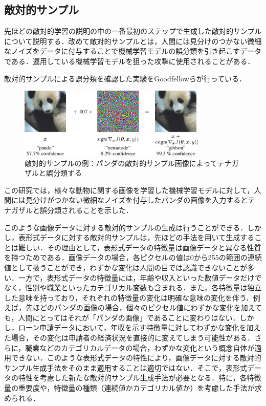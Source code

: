 \subsection{敵対的サンプル}
先ほどの敵対的学習の説明の中の一番最初のステップで生成した敵対的サンプルについて説明する．改めて敵対的サンプルとは，人間には見分けのつかない微細なノイズをデータに付与することで機械学習モデルの誤分類を引き起こすデータである．\cite{MBSD-AdversarialExample}運用している機械学習モデルを狙った攻撃に使用されることがある．

敵対的サンプルによる誤分類を確認した実験をGoodfellowらが行っている\cite{goodfellow2015explaining}．
\begin{figure}[H]
    \centering
    \includegraphics[width=0.8\textwidth]{images/goodfellow_panda.png}
    \caption{敵対的サンプルの例：パンダの敵対的サンプル画像によってテナガザルと誤分類する\cite{goodfellow2015explaining}}
    \label{fig:adversarial_example}
\end{figure}

この研究では，様々な動物に関する画像を学習した機械学習モデルに対して，人間には見分けがつかない微細なノイズを付与したパンダの画像を入力するとテナガザルと誤分類されることを示した．

このような画像データに対する敵対的サンプルの生成は行うことができる．しかし，表形式データに対する敵対的サンプルは，先ほどの手法を用いて生成することは難しい．その理由として，表形式データの特徴量は画像データと異なる性質を持つためである．画像データの場合，各ピクセルの値は0から255の範囲の連続値として扱うことができ，わずかな変化は人間の目では認識できないことが多い．一方で，表形式データの特徴量には，年齢や収入といった数値データだけでなく，性別や職業といったカテゴリカル変数も含まれる．また，各特徴量は独立した意味を持っており，それぞれの特徴量の変化は明確な意味の変化を伴う．例えば，先ほどのパンダの画像の場合，個々のピクセル値にわずかな変化を加えても，人間にとってはそれが「パンダの画像」であることに変わりはない．しかし，ローン申請データにおいて，年収を示す特徴量に対してわずかな変化を加えた場合，その変化は申請者の経済状況を直接的に変えてしまう可能性がある．さらに，職業などのカテゴリカルデータの場合，わずかな変化という概念自体が適用できない．このような表形式データの特性により，画像データに対する敵対的サンプル生成手法をそのまま適用することは適切ではない．そこで，表形式データの特性を考慮した新たな敵対的サンプル生成手法が必要となる．特に，各特徴量の重要度や，特徴量の種類（連続値かカテゴリカル値か）を考慮した手法が求められる．


